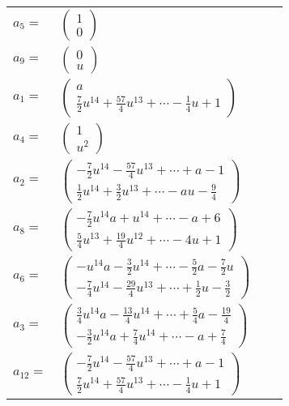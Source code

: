 \documentclass[1p]{elsarticle_modified}
\theoremstyle{definition}
\begin{document}
\begin{tabular}{m{7pt} m{180pt} m{7pt} m{180pt} }
\flushright $a_{5}=$&$\begin{pmatrix}1\\0\end{pmatrix}$ \\
\flushright $a_{9}=$&$\begin{pmatrix}0\\u\end{pmatrix}$ \\
\flushright $a_{1}=$&$\begin{pmatrix}a\\\frac{7}{2} u^{14}+\frac{57}{4} u^{13}+\cdots-\frac{1}{4} u+1\end{pmatrix}$ \\
\flushright $a_{4}=$&$\begin{pmatrix}1\\u^2\end{pmatrix}$ \\
\flushright $a_{2}=$&$\begin{pmatrix}-\frac{7}{2} u^{14}-\frac{57}{4} u^{13}+\cdots+a-1\\\frac{1}{2} u^{14}+\frac{3}{2} u^{13}+\cdots- a u-\frac{9}{4}\end{pmatrix}$ \\
\flushright $a_{8}=$&$\begin{pmatrix}-\frac{7}{2} u^{14} a+u^{14}+\cdots- a+6\\\frac{5}{4} u^{13}+\frac{19}{4} u^{12}+\cdots-4 u+1\end{pmatrix}$ \\
\flushright $a_{6}=$&$\begin{pmatrix}- u^{14} a-\frac{3}{2} u^{14}+\cdots-\frac{5}{2} a-\frac{7}{2} u\\-\frac{7}{4} u^{14}-\frac{29}{4} u^{13}+\cdots+\frac{1}{2} u-\frac{3}{2}\end{pmatrix}$ \\
\flushright $a_{3}=$&$\begin{pmatrix}\frac{3}{4} u^{14} a-\frac{13}{4} u^{14}+\cdots+\frac{5}{4} a-\frac{19}{4}\\-\frac{3}{2} u^{14} a+\frac{7}{4} u^{14}+\cdots- a+\frac{7}{4}\end{pmatrix}$ \\
\flushright $a_{12}=$&$\begin{pmatrix}-\frac{7}{2} u^{14}-\frac{57}{4} u^{13}+\cdots+a-1\\\frac{7}{2} u^{14}+\frac{57}{4} u^{13}+\cdots-\frac{1}{4} u+1\end{pmatrix}$ \\

\end{tabular}
\end{document}
